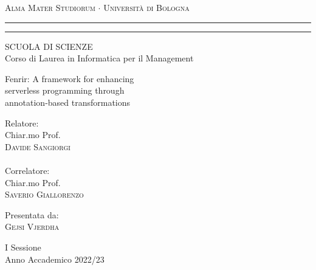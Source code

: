 \begin{otherlanguage}{italian}
\begin{titlepage}
\begin{center}
{{\Large{\textsc{Alma Mater Studiorum $\cdot$ Universit\`a di
Bologna}}}} \rule[0.1cm]{15.8cm}{0.1mm}
\rule[0.5cm]{15.8cm}{0.6mm}
{\small{ SCUOLA DI SCIENZE\\
Corso di Laurea in Informatica per il Management}}
\end{center}
\vspace{15mm}
\begin{center}
{\LARGE{ Fenrir: A framework for enhancing  }}\\ %
\vspace{3mm}
{\LARGE{ serverless programming through  }}\\
\vspace{3mm}
{\LARGE{ annotation-based transformations }}\\
\end{center}
\vspace{40mm}
\par
\noindent
\begin{minipage}[t]{0.47\textwidth}
{\large{ Relatore:\\
Chiar.mo Prof.\\
\textsc{Davide Sangiorgi}\\\\
Correlatore:\\
Chiar.mo Prof.\\
\textsc{Saverio Giallorenzo}}}
\end{minipage}
\hfill
\begin{minipage}[t]{0.47\textwidth}\raggedleft
{\large{ Presentata da:\\
\textsc{Gejsi Vjerdha}}}
\end{minipage}
\vspace{20mm}
\begin{center}
{\large{ I Sessione\\
Anno Accademico 2022/23 }}%
\end{center}
\end{titlepage}
\end{otherlanguage}
